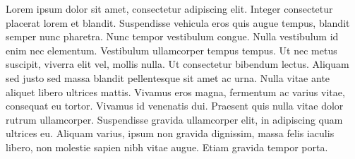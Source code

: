 Lorem ipsum dolor sit amet, consectetur adipiscing elit. Integer consectetur placerat lorem et blandit. Suspendisse vehicula eros quis augue tempus, blandit semper nunc pharetra. Nunc tempor vestibulum congue. Nulla vestibulum id enim nec elementum. Vestibulum ullamcorper tempus tempus. Ut nec metus suscipit, viverra elit vel, mollis nulla. Ut consectetur bibendum lectus. Aliquam sed justo sed massa blandit pellentesque sit amet ac urna. Nulla vitae ante aliquet libero ultrices mattis. Vivamus eros magna, fermentum ac varius vitae, consequat eu tortor. Vivamus id venenatis dui. Praesent quis nulla vitae dolor rutrum ullamcorper. Suspendisse gravida ullamcorper elit, in adipiscing quam ultrices eu. Aliquam varius, ipsum non gravida dignissim, massa felis iaculis libero, non molestie sapien nibh vitae augue. Etiam gravida tempor porta.
 